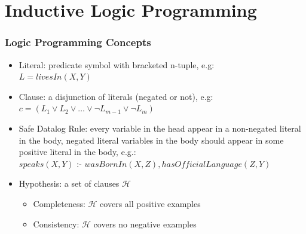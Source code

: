 \documentclass{beamer}
\begin{document}
\section{Inductive Logic Programming}                                
\begin{frame}
\frametitle{Logic Programming Concepts}
  \begin{itemize}
   \item Literal: predicate symbol with bracketed n-tuple, e.g: \\ 
      \quad $L=livesIn(X,Y)$
   \item Clause: a disjunction of literals (negated or not), e.g: \\ 
      \quad $c=(L_1 \vee L_2 \vee \ldots \vee \neg L_{m-1} \vee \neg L_{m})$
   \item Safe Datalog Rule: every variable in the head appear in a non-negated literal in the body, negated
literal variables in the body should appear in some positive literal in the body, e.g.: \\ 
    \quad $speaks(X,Y)$ :- $wasBornIn(X,Z),hasOfficialLanguage(Z,Y)$
   \item Hypothesis: a set of clauses $\mathcal{H}$
     \begin{itemize}
	\item Completeness: $\mathcal{H}$ covers all positive examples
	\item Consistency: $\mathcal{H}$ covers no negative examples
     \end{itemize}
  \end{itemize}
\end{frame}
\end{document}

